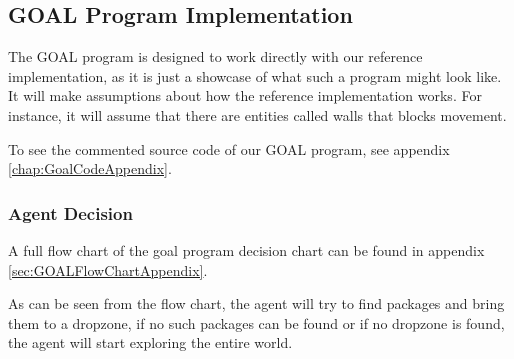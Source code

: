 \subsection{GOAL Program Implementation}

The GOAL program is designed to work directly with our reference implementation,
as it is just a showcase of what such a program might look like. It
will make assumptions about how the reference implementation works.
For instance, it will assume that there are entities called walls
that blocks movement. 

To see the commented source code of our GOAL program, see appendix
\ref{chap:GoalCodeAppendix}.


\subsubsection{Agent Decision}

A full flow chart of the goal program decision chart can be found
in appendix \ref{sec:GOALFlowChartAppendix}.

As can be seen from the flow chart, the agent will try to find packages
and bring them to a dropzone, if no such packages can be found or
if no dropzone is found, the agent will start exploring the entire
world.

